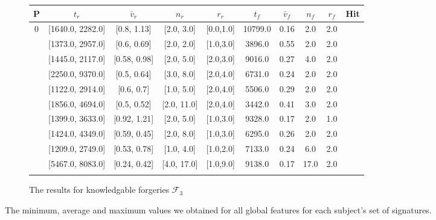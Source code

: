 \documentclass[a4paper, oneside]{csthesis}
\newcommand{\xmark}{\ding{55}}%
\begin{document}
\begin{figure}
    \begin{subfigure}[b]{\textwidth}
            \centering
            \tabcolsep 4pt
            \small
            \begin{tabular}{c|cccc||cccc||c}
            \hline
            \textbf{P} & $t_r$ & $\bar{v}_r$ & $n_r$ & $r_r$ & $t_f$ & $\bar{v}_f$ & $n_f$ & $r_f$ & Hit \\
            \hline
            0 & [1640.0, 2282.0] & [0.8, 1.13] & [2.0, 3.0] & [0.0,1.0] & 10799.0 & 0.16 & 2.0 & 2.0 & \xmark \\ \hdashline[0.5pt/3pt]
            1 & [1373.0, 2957.0] & [0.6, 0.69] & [2.0, 2.0] & [1.0,3.0] & 3896.0 & 0.55 & 2.0 & 2.0 & \xmark \\ \hdashline[0.5pt/3pt]
            2 & [1445.0, 2117.0] & [0.58, 0.98] & [2.0, 5.0] & [2.0,3.0] & 9016.0 & 0.27 & 4.0 & 2.0 & \xmark \\ \hdashline[0.5pt/3pt]
            3 & [2250.0, 9370.0] & [0.5, 0.64] & [3.0, 8.0] & [2.0,4.0] & 6731.0 & 0.24 & 2.0 & 2.0 & \xmark \\ \hdashline[0.5pt/3pt]
            4 & [1122.0, 2914.0] & [0.6, 0.7] & [1.0, 5.0] & [2.0,4.0] & 5506.0 & 0.29 & 2.0 & 2.0 & \xmark \\ \hdashline[0.5pt/3pt]
            5 & [1856.0, 4694.0] & [0.5, 0.52] & [2.0, 11.0] & [2.0,4.0] & 3442.0 & 0.41 & 3.0 & 2.0 & \xmark \\ \hdashline[0.5pt/3pt]
            6 & [1399.0, 3633.0] & [0.92, 1.21] & [2.0, 5.0] & [1.0,3.0] & 9328.0 & 0.17 & 2.0 & 1.0 & \xmark \\ \hdashline[0.5pt/3pt]
            7 & [1424.0, 4349.0] & [0.59, 0.45] & [2.0, 8.0] & [1.0,3.0] & 6295.0 & 0.26 & 2.0 & 2.0 & \xmark \\ \hdashline[0.5pt/3pt]
            8 & [1209.0, 2749.0] & [0.53, 0.78] & [1.0, 4.0] & [1.0,2.0] & 7133.0 & 0.24 & 6.0 & 2.0 & \xmark \\ \hdashline[0.5pt/3pt]
            9 & [5467.0, 8083.0] & [0.24, 0.42] & [4.0, 17.0] & [1.0,9.0] & 9138.0 & 0.17 & 17.0 & 2.0 & \xmark \\ \hdashline[0.5pt/3pt]
            \hline
            \end{tabular}
            \caption{The results for knowledgable forgeries $\mathcal{F}_3$}
            \label{tbl:global-features-forg-knowledgable}
    \end{subfigure}%


    \caption{The minimum, average and maximum values we obtained for all global features for each subject's set of signatures.}
    \label{fig:global-features-forgeries}
\end{figure}
\end{document}
